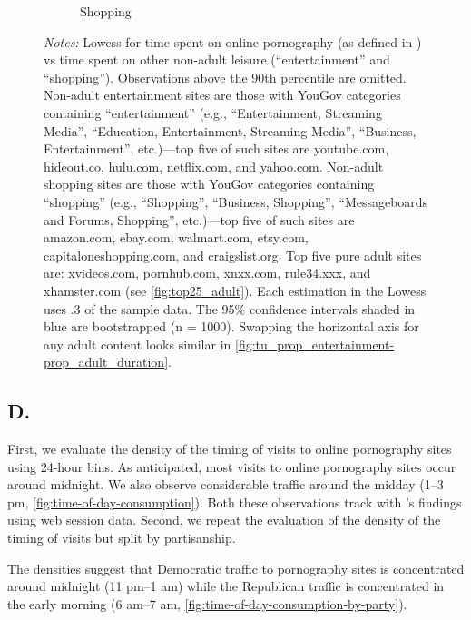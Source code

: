 \documentclass[12pt,twoside]{article}
\begin{document}
\begin{figure}[!h]
\begin{subfigure}[b]{0.495\textwidth}
         \caption{Shopping}
     \end{subfigure}
\caption*{\footnotesize \emph{Notes:}
Lowess for time spent on online pornography (as defined in ) vs time spent on other non-adult leisure (``entertainment'' and ``shopping'').
Observations above the 90th percentile are omitted. 
Non-adult entertainment sites are those with YouGov categories containing ``entertainment'' (e.g., ``Entertainment, Streaming Media'', ``Education, Entertainment, Streaming Media'', ``Business, Entertainment'', etc.)---top five of such sites are youtube.com, hideout.co, hulu.com, netflix.com, and yahoo.com.
Non-adult shopping sites are those with YouGov categories containing ``shopping'' (e.g., ``Shopping'', ``Business, Shopping'', ``Messageboards and Forums, Shopping'', etc.)---top five of such sites are amazon.com, ebay.com, walmart.com, etsy.com, capitaloneshopping.com, and craigslist.org.
Top five pure adult sites are: xvideos.com, pornhub.com, xnxx.com, rule34.xxx, and xhamster.com (see \cref{fig:top25_adult}).
Each estimation in the Lowess uses .3 of the sample data.
The 95\% confidence intervals shaded in blue are bootstrapped (n = 1000).
Swapping the horizontal axis for any adult content looks similar in \cref{fig:tu_prop_entertainment-prop_adult_duration}. 
}
\end{figure}


\clearpage
\setcounter{table}{0}
\setcounter{figure}{0}
\setcounter{equation}{0}
\FloatBarrier
\renewcommand{\thetable}{D\arabic{table}}
\renewcommand{\thefigure}{D\arabic{figure}}
\renewcommand{\theequation}{D\arabic{equation}}
\subsection{D. \smDTitle{}}\label{sm:smD}

First, we evaluate the density of the timing of visits to online pornography sites using 24-hour bins. As anticipated, most visits to online pornography sites occur around midnight. We also observe considerable traffic around the midday (1--3 pm, \cref{fig:time-of-day-consumption}). Both these observations track with \cite{webporn}'s findings using web session data. Second, we repeat the evaluation of the density of the timing of visits but split by partisanship.

The densities suggest that Democratic traffic to pornography sites is concentrated around midnight (11 pm--1 am) while the Republican traffic is concentrated in the early morning (6 am--7 am, \cref{fig:time-of-day-consumption-by-party}).
\end{document}
